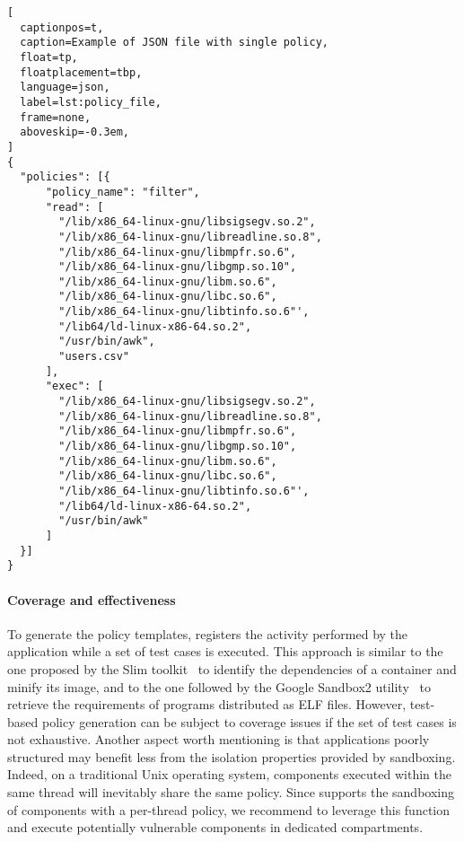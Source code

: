 \begin{lstlisting}[
  captionpos=t,
  caption=Example of JSON file with single policy,
  float=tp,
  floatplacement=tbp,
  language=json,
  label=lst:policy_file,
  frame=none,
  aboveskip=-0.3em,
]
{
  "policies": [{
      "policy_name": "filter",
      "read": [
        "/lib/x86_64-linux-gnu/libsigsegv.so.2",
        "/lib/x86_64-linux-gnu/libreadline.so.8",
        "/lib/x86_64-linux-gnu/libmpfr.so.6",
        "/lib/x86_64-linux-gnu/libgmp.so.10",
        "/lib/x86_64-linux-gnu/libm.so.6",
        "/lib/x86_64-linux-gnu/libc.so.6",
        "/lib/x86_64-linux-gnu/libtinfo.so.6"',
        "/lib64/ld-linux-x86-64.so.2",
        "/usr/bin/awk",
        "users.csv"
      ],
      "exec": [
        "/lib/x86_64-linux-gnu/libsigsegv.so.2",
        "/lib/x86_64-linux-gnu/libreadline.so.8",
        "/lib/x86_64-linux-gnu/libmpfr.so.6",
        "/lib/x86_64-linux-gnu/libgmp.so.10",
        "/lib/x86_64-linux-gnu/libm.so.6",
        "/lib/x86_64-linux-gnu/libc.so.6",
        "/lib/x86_64-linux-gnu/libtinfo.so.6"',
        "/lib64/ld-linux-x86-64.so.2",
        "/usr/bin/awk"
      ]
  }]
}
\end{lstlisting}

\paragraph*{Coverage and effectiveness}

To generate the policy templates, \dmng registers the activity
performed by the application while a set of test cases is
executed. This approach is similar to the one proposed by the Slim
toolkit~\cite{slimtoolkit} to identify the dependencies of a container
and minify its image, and to the one followed by the Google Sandbox2
utility~\cite{sandbox2} to retrieve the requirements of programs
distributed as ELF files. However, test-based policy generation can be
subject to coverage issues if the set of test cases is not
exhaustive. Another aspect worth mentioning is that applications
poorly structured may benefit less from the isolation properties
provided by sandboxing. Indeed, on a traditional Unix operating
system, components executed within the same thread will inevitably
share the same policy. Since \dmng supports the sandboxing of
components with a per-thread policy, we recommend to leverage this
function and execute potentially vulnerable components in dedicated
compartments.

